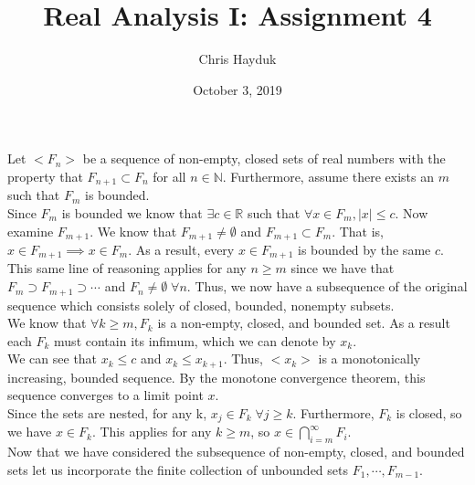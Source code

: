 \documentclass[12pt]{article}
\newenvironment{problem}[2][Problem]{\begin{trivlist}
\item[\hskip \labelsep {\bfseries #1}\hskip \labelsep {\bfseries #2.}]}{\end{trivlist}}
\begin{document}
\title{Real Analysis I: Assignment 4}

\author{Chris Hayduk}
\date{October 3, 2019}

\maketitle

\begin{problem}{1}
\end{problem}

Let $<F_n>$ be a sequence of non-empty, closed sets of real numbers with the property that $F_{n+1} \subset F_{n}$ for all $n \in \mathbb{N}$. Furthermore, assume there exists an $m$ such that $F_m$ is bounded.\\

Since $F_m$ is bounded we know that $\exists c \in \mathbb{R}$ such that $\forall x \in F_m, |x| \leq c$. Now examine $F_{m+1}$. We know that $F_{m+1} \neq \emptyset$ and $F_{m+1} \subset F_{m}$. That is, $x \in F_{m+1} \implies x \in F_{m}$. As a result, every $x \in F_{m+1}$ is bounded by the same $c$.\\

This same line of reasoning applies for any $n \geq m$ since we have that $F_m \supset F_{m+1} \supset \cdots$ and $F_n \neq \emptyset \; \forall n$. Thus, we now have a subsequence of the original sequence which consists solely of closed, bounded, nonempty subsets.\\

We know that $\forall k \geq m, F_k$ is a non-empty, closed, and bounded set. As a result each $F_k$ must contain its infimum, which we can denote by $x_k$.\\

We can see that $x_k \leq c$ and $x_k \leq x_{k+1}$. Thus, $<x_k>$ is a monotonically increasing, bounded sequence. By the monotone convergence theorem, this sequence converges to a limit point $x$.\\

Since the sets are nested, for any k, $x_j \in F_k \; \forall j \geq k$. Furthermore, $F_k$ is closed, so we have $x \in F_k$. This applies for any $k \geq m$, so $x \in \bigcap^\infty_{i=m} F_i$.\\

Now that we have considered the subsequence of non-empty, closed, and bounded sets let us incorporate the finite collection of unbounded sets $F_1, \cdots, F_{m-1}$.\\
\end{document}
